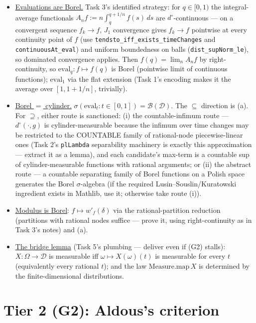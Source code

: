\documentclass[11pt]{article}
\theoremstyle{plain}
\theoremstyle{remark}
\newcommand{\D}{\mathcal D}\newcommand{\Q}{\mathbb Q}\newcommand{\eps}{\varepsilon}
\begin{document}
\begin{itemize}
\item[(a)] \underline{Evaluations are Borel.} Task 3's identified strategy:
for $q\in[0,1)$ the integral-average functionals
$A_nf:=n\int_q^{q+1/n}f(s)\,ds$ are $d^\circ$-continuous --- on a convergent
sequence $f_k\to f$, $J_1$ convergence gives $f_k\to f$ pointwise at every
continuity point of $f$ (use \texttt{tendsto\_iff\_exists\_timeChanges} and
\texttt{continuousAt\_eval}) and uniform boundedness on balls
(\texttt{dist\_supNorm\_le}), so dominated convergence applies. Then
$f(q)=\lim_nA_nf$ by right-continuity, so
$\mathrm{eval}_q:f\mapsto f(q)$ is Borel (pointwise limit of continuous
functions); $\mathrm{eval}_1$ via the flat extension (Task 1's encoding makes
it the average over $[1,1+1/n]$, trivially).
\item[(b)] \underline{Borel $=$ cylinder.} $\sigma(\mathrm{eval}_t:t\in[0,1])
=\mathcal B(\D)$. The $\subseteq$ direction is (a). For $\supseteq$, either
route is sanctioned: (i) the countable-infimum route --- $d^\circ(\cdot,g)$ is
cylinder-measurable because the infimum over time changes may be restricted to
the COUNTABLE family of rational-node piecewise-linear ones (Task 2's
\texttt{plLambda} separability machinery is exactly this approximation ---
extract it as a lemma), and each candidate's max-term is a countable sup of
cylinder-measurable functions with rational arguments; or (ii) the abstract
route --- a countable separating family of Borel functions on a Polish space
generates the Borel $\sigma$-algebra (if the required Lusin--Souslin/Kuratowski
ingredient exists in Mathlib, use it; otherwise take route (i)).
\item[(c)] \underline{Modulus is Borel}: $f\mapsto w'_f(\delta)$ via the
rational-partition reduction (partitions with rational nodes suffice ---
prove it, using right-continuity as in Task 3's notes) and (a).
\item[(d)] \underline{The bridge lemma} (Task 5's plumbing --- deliver even if
(G2) stalls): $X:\Omega\to\D$ is measurable iff $\omega\mapsto X(\omega)(t)$
is measurable for every $t$ (equivalently every rational $t$); and the law
$\mathrm{Measure.map}\,X$ is determined by the finite-dimensional
distributions.
\end{itemize}

\section*{Tier 2 (G2): Aldous's criterion}
\end{document}

